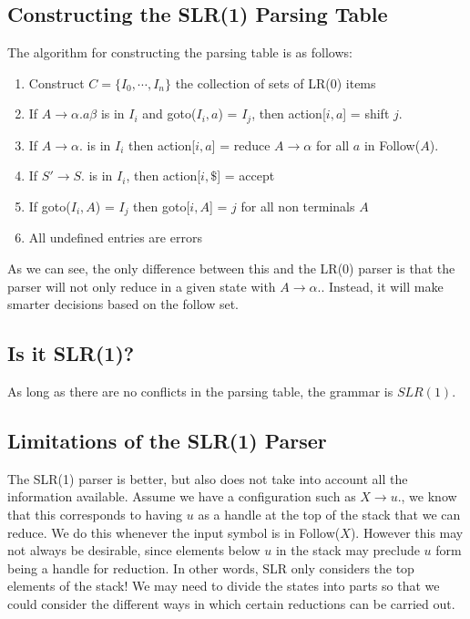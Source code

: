 \documentclass[12pt,letterpaper]{amsbook}
\theoremstyle{definition}
\begin{document}
\subsection{Constructing the SLR(1) Parsing Table}

The algorithm for constructing the parsing table is as follows:

\begin{enumerate}
  \item Construct $C = \{I_0,\cdots,I_n\}$ the collection of sets of LR(0) items
  \item If $A \rightarrow \alpha . a\beta$ is in $I_i$ and goto($I_i,a$) = $I_j$, then action[$i,a$] = shift $j$.
  \item If $A \rightarrow \alpha .$ is in $I_i$ then action[$i,a$] = reduce $A \rightarrow \alpha$ for all $a$ in Follow($A$).
  \item If $S' \rightarrow S.$ is in $I_i$, then action[$i,\$$] = accept
  \item If goto($I_i,A$) = $I_j$ then goto[$i,A$] = $j$ for all non terminals $A$
  \item All undefined entries are errors
\end{enumerate}

As we can see, the only difference between this and the LR(0) parser is that the parser will not only reduce in a given state with $A \rightarrow \alpha .$. Instead, it will make smarter decisions based on the follow set.

\subsection{Is it SLR(1)?}

As long as there are no conflicts in the parsing table, the grammar is $SLR(1)$.

\subsection{Limitations of the SLR(1) Parser}

The SLR(1) parser is better, but also does not take into account all the information available. Assume we have a configuration such as $X \rightarrow u .$, we know that this corresponds to having $u$ as a handle at the top of the stack that we can reduce. We do this whenever the input symbol is in Follow($X$). However this may not always be desirable, since elements below $u$ in the stack may preclude $u$ form being a handle for reduction. In other words, SLR only considers the top elements of the stack! We may need to divide the states into parts so that we could consider the different ways in which certain reductions can be carried out.
\end{document}
